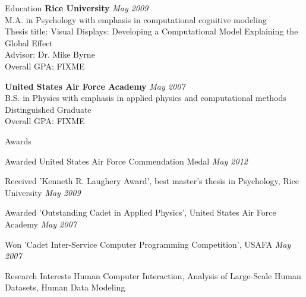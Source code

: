 \documentclass{resume} %
\begin{document}

\begin{rSection}{Education}
{\bf Rice University} \hfill {\em May 2009} \\ 
M.A. in Psychology with emphasis in computational cognitive modeling \\
Thesis title: Visual Displays: Developing a Computational Model Explaining the Global Effect \\
Advisor: Dr. Mike Byrne \\
Overall GPA: FIXME 

{\bf United States Air Force Academy} \hfill {\em May 2007} \\ 
B.S. in Physics with emphasis in applied physics and computational methods \\
Distinguished Graduate \\
Overall GPA: FIXME
\end{rSection}


\begin{rSection}{Awards}
\item Awarded United States Air Force Commendation Medal \hfill {\em May 2012}
\item Received 'Kenneth R. Laughery Award', best master’s thesis in Psychology, Rice University \hfill {\em May 2009}
\item Awarded 'Outstanding Cadet in Applied Physics', United States Air Force Academy \hfill {\em May 2007}
\item Won 'Cadet Inter-Service Computer Programming Competition', USAFA \hfill {\em May 2007}
\end{rSection}

\begin{rSection}{Research Interests}
Human Computer Interaction, Analysis of Large-Scale Human Datasets, Human Data Modeling
\end{rSection}

\end{document}
